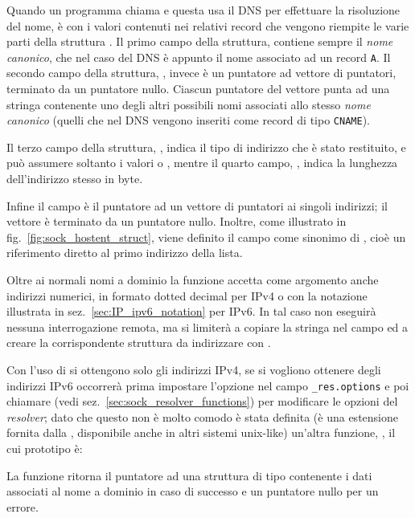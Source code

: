 Quando un programma chiama  e questa usa il DNS per
effettuare la risoluzione del nome, è con i valori contenuti nei relativi
record che vengono riempite le varie parti della struttura .
Il primo campo della struttura,  contiene sempre il \textsl{nome
  canonico}, che nel caso del DNS è appunto il nome associato ad un record
\texttt{A}. Il secondo campo della struttura, , invece è un
puntatore ad vettore di puntatori, terminato da un puntatore nullo. Ciascun
puntatore del vettore punta ad una stringa contenente uno degli altri
possibili nomi associati allo stesso \textsl{nome canonico} (quelli che nel
DNS vengono inseriti come record di tipo \texttt{CNAME}).

Il terzo campo della struttura, , indica il tipo di indirizzo
che è stato restituito, e può assumere soltanto i valori  o
, mentre il quarto campo, , indica la
lunghezza dell'indirizzo stesso in byte. 

Infine il campo  è il puntatore ad un vettore di puntatori
ai singoli indirizzi; il vettore è terminato da un puntatore nullo.  Inoltre,
come illustrato in fig.~\ref{fig:sock_hostent_struct}, viene definito il campo
 come sinonimo di , cioè un riferimento
diretto al primo indirizzo della lista.

Oltre ai normali nomi a dominio la funzione accetta come argomento
 anche indirizzi numerici, in formato dotted decimal per IPv4 o
con la notazione illustrata in sez.~\ref{sec:IP_ipv6_notation} per IPv6. In
tal caso  non eseguirà nessuna interrogazione remota, ma
si limiterà a copiare la stringa nel campo  ed a creare la
corrispondente struttura  da indirizzare con
.

Con l'uso di  si ottengono solo gli indirizzi IPv4, se si
vogliono ottenere degli indirizzi IPv6 occorrerà prima impostare l'opzione
 nel campo \texttt{\_res.options} e poi chiamare
 (vedi sez.~\ref{sec:sock_resolver_functions}) per modificare
le opzioni del \textit{resolver}; dato che questo non è molto comodo è stata
definita (è una estensione fornita dalla , disponibile anche in
altri sistemi unix-like) un'altra funzione, , il cui
prototipo è:

\begin{funcproto}{
}

{La funzione ritorna il puntatore ad una
  struttura di tipo  contenente i dati associati al nome a
  dominio in caso di successo e  un puntatore nullo per un errore.}
\end{funcproto}

